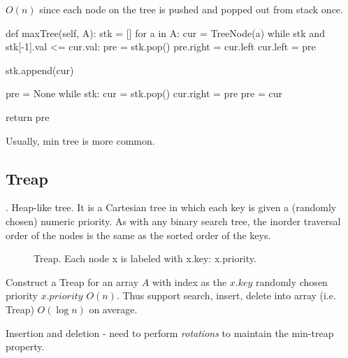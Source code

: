 $O(n)$ since each node on the tree is pushed and popped out from stack once.

\newpage
\begin{python}
def maxTree(self, A):
    stk = []
    for a in A:
        cur = TreeNode(a)
        while stk and stk[-1].val <= cur.val:
            pre = stk.pop()
            pre.right = cur.left
            cur.left = pre

        stk.append(cur)

    pre = None
    while stk:
        cur = stk.pop()
        cur.right = pre
        pre = cur

    return pre
\end{python}

Usually, min tree is more common. 
\subsection{Treap}
. Heap-like tree. It is a Cartesian tree in which each key is given a (randomly chosen) numeric priority. As with any binary search tree, the inorder traversal order of the nodes is the same as the sorted order of the keys.

\begin{figure}[hbtp]
\centering
{}
\caption{Treap. Each node x is labeled with x.key: x.priority.}
\label{fig:treap}
\end{figure}

Construct a Treap for an array $A$ with index as the $x.key$ randomly chosen priority $x.priority$ $O(n)$. Thus support search, insert, delete into array (i.e. Treap) $O(\log n)$ on average. 

Insertion and deletion - need to perform \textit{rotations} to maintain the min-treap property. 
